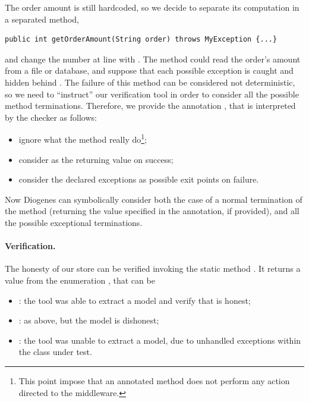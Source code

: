 The order amount is still hardcoded, so we decide to separate its computation
in a separated method, \eg
\begin{mdframed}
\begin{verbatim}
public int getOrderAmount(String order) throws MyException {...}
\end{verbatim}
\end{mdframed}
and change the number  at line  with .
The method could read the order's amount from a file or database,
and suppose that each possible exception
is caught and hidden behind . 
The failure of this method can be considered not deterministic,
so we need to ``instruct'' our verification tool
in order to consider all the possible method terminations.
%
Therefore, we provide the annotation , that
is interpreted by the checker as follows:

\begin{itemize}[noitemsep,topsep=0pt]
\item ignore what the method really do\footnote{This point impose
that an annotated method does not perform any action
directed to the middleware.};
\item consider  as the returning value on success;
\item consider the declared exceptions as possible exit points on failure.
\end{itemize}

Now Diogenes can symbolically consider both the case of a normal 
termination of the method
(returning the value specified in the annotation, if provided),
and all the possible exceptional terminations.

\paragraph{Verification.}
The honesty of our store can be verified
invoking the static method
.
%
It returns a value from the enumeration , that can be

\begin{itemize}[noitemsep,topsep=0pt]
\item {}: the tool was able to extract a \coco model and verify that is honest;
\item {}: as above, but the model is dishonest;
\item {}: the tool was unable to extract a model,
\eg due to unhandled exceptions within the class under test.
\end{itemize}

